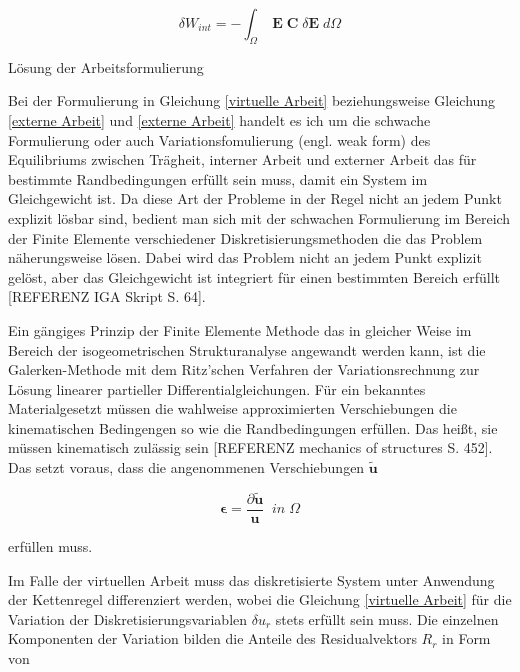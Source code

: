 \documentclass[german,a4paper,12pt,oneside]{scrbook}
\theoremstyle{definition}
\theoremstyle{definition}
\theoremstyle{definition}
\theoremstyle{definition}
\theoremstyle{definition}
\theoremstyle{definition}
\begin{document}
\begin{equation}
    \delta W_{int} = - \int_{\Omega}^{} \; \bm{E} \; \bm{C} \; \delta \bm{E} \; d\Omega
\end{equation}

\vspace{0.5cm}
\LARGE
Lösung der Arbeitsformulierung

\vspace{0.5cm}
\normalsize
Bei der Formulierung in Gleichung \eqref{virtuelle Arbeit} beziehungsweise Gleichung \eqref{externe Arbeit} und \eqref{externe Arbeit} handelt es ich um die schwache Formulierung oder auch Variationsfomulierung (engl. weak form) des Equilibriums zwischen Trägheit, interner Arbeit und externer Arbeit das für bestimmte Randbedingungen erfüllt sein muss, damit ein System im Gleichgewicht ist. Da diese Art der Probleme in der Regel nicht an jedem Punkt explizit lösbar sind, bedient man sich mit der schwachen Formulierung im Bereich der Finite Elemente verschiedener Diskretisierungsmethoden die das Problem näherungsweise lösen. Dabei wird das Problem nicht an jedem Punkt explizit gelöst, aber das Gleichgewicht ist integriert für einen bestimmten Bereich erfüllt [REFERENZ IGA Skript S. 64].

Ein gängiges Prinzip der Finite Elemente Methode das in gleicher Weise im Bereich der isogeometrischen Strukturanalyse angewandt werden kann, ist die Galerken-Methode mit dem Ritz'schen Verfahren der Variationsrechnung zur Lösung linearer partieller Differentialgleichungen. Für ein bekanntes Materialgesetzt müssen die wahlweise approximierten Verschiebungen die kinematischen Bedingengen so wie die Randbedingungen erfüllen. Das heißt, sie müssen kinematisch zulässig sein [REFERENZ mechanics of structures S. 452]. Das setzt voraus, dass die angenommenen Verschiebungen $\tilde{\bm{u}}$

\begin{equation}
    \bm{\epsilon} = \frac{\partial \tilde{\bm{u}}}{\bm{u}}  \; \; in \; \Omega
\end{equation}

\vspace{0.5cm}
erfüllen muss.

\vspace{0.5cm}
Im Falle der virtuellen Arbeit muss das diskretisierte System unter Anwendung der Kettenregel differenziert werden, wobei die Gleichung \eqref{virtuelle Arbeit} für die Variation der Diskretisierungsvariablen $\delta u_r$ stets erfüllt sein muss. Die einzelnen Komponenten der Variation bilden die Anteile des Residualvektors  ${R}_r$ in Form von
\end{document}

